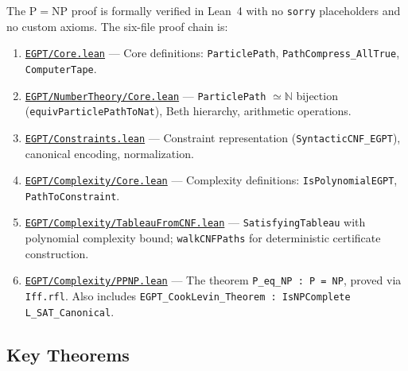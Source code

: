 \documentclass[11pt,a4paper]{article}
\begin{document}
The $\mathrm{P} = \mathrm{NP}$ proof is formally verified in Lean~4 with no \texttt{sorry} placeholders and no custom axioms. The six-file proof chain is:

\begin{enumerate}
    \item \href{https://eabadir.github.io/EGPT/Lean/EGPT/Core.lean}{\texttt{EGPT/Core.lean}} --- Core definitions: \texttt{ParticlePath}, \texttt{PathCompress\_AllTrue}, \texttt{ComputerTape}.
    \item \href{https://eabadir.github.io/EGPT/Lean/EGPT/NumberTheory/Core.lean}{\texttt{EGPT/NumberTheory/Core.lean}} --- \texttt{ParticlePath} $\simeq \mathbb{N}$ bijection (\texttt{equivParticlePathToNat}), Beth hierarchy, arithmetic operations.
    \item \href{https://eabadir.github.io/EGPT/Lean/EGPT/Constraints.lean}{\texttt{EGPT/Constraints.lean}} --- Constraint representation (\texttt{SyntacticCNF\_EGPT}), canonical encoding, normalization.
    \item \href{https://eabadir.github.io/EGPT/Lean/EGPT/Complexity/Core.lean}{\texttt{EGPT/Complexity/Core.lean}} --- Complexity definitions: \texttt{IsPolynomialEGPT}, \texttt{PathToConstraint}.
    \item \href{https://eabadir.github.io/EGPT/Lean/EGPT/Complexity/TableauFromCNF.lean}{\texttt{EGPT/Complexity/TableauFromCNF.lean}} --- \texttt{SatisfyingTableau} with polynomial complexity bound; \texttt{walkCNFPaths} for deterministic certificate construction.
    \item \href{https://eabadir.github.io/EGPT/Lean/EGPT/Complexity/PPNP.lean}{\texttt{EGPT/Complexity/PPNP.lean}} --- The theorem \texttt{P\_eq\_NP : P = NP}, proved via \texttt{Iff.rfl}. Also includes \texttt{EGPT\_CookLevin\_Theorem : IsNPComplete L\_SAT\_Canonical}.
\end{enumerate}

\subsection{Key Theorems}
\end{document}
